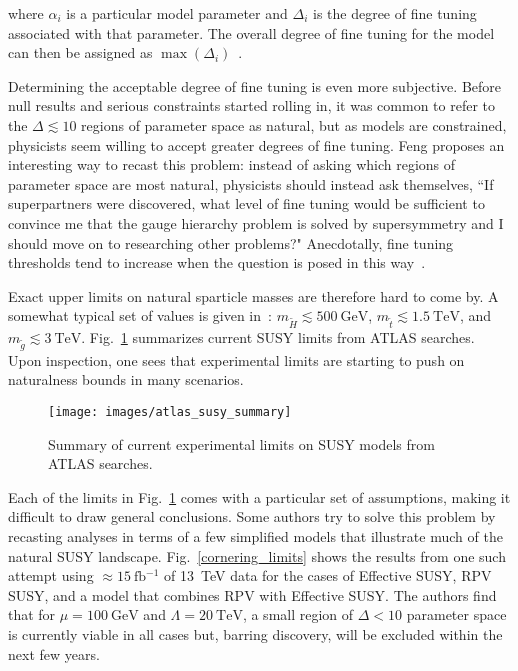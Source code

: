 \documentclass[12pt]{article}
\begin{document}
    \noindent where $\alpha_i$ is a particular model parameter and $\Delta_i$ is the degree of fine tuning associated with that parameter. The overall degree of fine tuning for the model can then be assigned as $\max{\left(\Delta_i\right)}$~\cite{cornering}.

    Determining the acceptable degree of fine tuning is even more subjective. Before null results and serious constraints started rolling in, it was common to refer to the $\Delta \lesssim 10$ regions of parameter space as natural, but as models are constrained, physicists seem willing to accept greater degrees of fine tuning. Feng proposes an interesting way to recast this problem: instead of asking which regions of parameter space are most natural, physicists should instead ask themselves, ``If superpartners were discovered, what level of fine tuning would be sufficient to convince me that the gauge hierarchy problem is solved by supersymmetry and I should move on to researching other problems?" Anecdotally, fine tuning thresholds tend to increase when the question is posed in this way~\cite{feng}.

    Exact upper limits on natural sparticle masses are therefore hard to come by. A somewhat typical set of values is given in~\cite{drees_kim}: $m_{\tilde{H}} \lesssim \SI{500}{\giga\electronvolt}$, $m_{\tilde{t}} \lesssim \SI{1.5}{\tera\electronvolt}$, and $m_{\tilde{g}} \lesssim \SI{3}{\tera\electronvolt}$. Fig.~\ref{atlas_susy_summary} summarizes current SUSY limits from ATLAS searches. Upon inspection, one sees that experimental limits are starting to push on naturalness bounds in many scenarios.

    \noindent \begin{figure}[htbp] \begin{center}
    \texttt{[image: images/atlas\_susy\_summary]}
    \caption{Summary of current experimental limits on SUSY models from ATLAS searches.}
    \label{atlas_susy_summary}
    \end{center} \end{figure}

    Each of the limits in Fig.~\ref{atlas_susy_summary} comes with a particular set of assumptions, making it difficult to draw general conclusions. Some authors try to solve this problem by recasting analyses in terms of a few simplified models that illustrate much of the natural SUSY landscape. Fig.~\ref{cornering_limits} shows the results from one such attempt using $\approx \SI{15}{\femto\barn^{-1}}$ of \SI{13}{\tera\electronvolt} data for the cases of Effective SUSY, RPV SUSY, and a model that combines RPV with Effective SUSY. The authors find that for $\mu = \SI{100}{\giga\electronvolt}$ and $\Lambda = \SI{20}{\tera\electronvolt}$, a small region of $\Delta < 10$ parameter space is currently viable in all cases but, barring discovery, will be excluded within the next few years.
    
\end{document}
